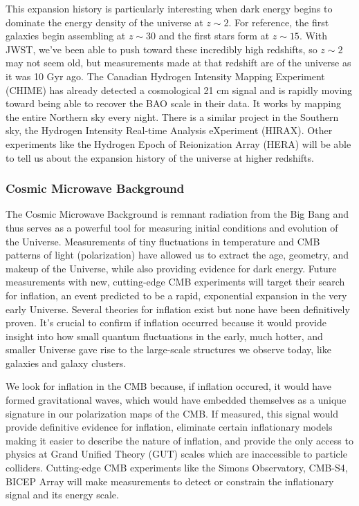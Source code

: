 This expansion history is particularly interesting when dark energy begins to dominate the energy density of the universe at $z \sim 2$. For reference, the first galaxies begin assembling at $z \sim 30$ and the first stars form at $z \sim 15$. With JWST, we've been able to push toward these incredibly high redshifts, so $z \sim 2$ may not seem old, but measurements made at that redshift are of the universe as it was 10 Gyr ago. The Canadian Hydrogen Intensity Mapping Experiment (CHIME) has already detected a cosmological 21 cm signal and is rapidly moving toward being able to recover the BAO scale in their data. It works by mapping the entire Northern sky every night. There is a similar project in the Southern sky, the Hydrogen Intensity Real-time Analysis eXperiment (HIRAX). Other experiments like the Hydrogen Epoch of Reionization Array (HERA) will be able to tell us about the expansion history of the universe at higher redshifts.

\subsubsection{Cosmic Microwave Background}

The Cosmic Microwave Background is remnant radiation from the Big Bang and thus serves as a powerful tool for measuring initial conditions and evolution of the Universe. Measurements of tiny fluctuations in temperature and CMB patterns of light (polarization) have allowed us to extract the age, geometry, and makeup of the Universe, while also providing evidence for dark energy. Future measurements with new, cutting-edge CMB experiments will target their search for inflation, an event predicted to be a rapid, exponential expansion in the very early Universe. Several theories for inflation exist but none have been definitively proven. It's crucial to confirm if inflation occurred because it would provide insight into how small quantum fluctuations in the early, much hotter, and smaller Universe gave rise to the large-scale structures we observe today, like galaxies and galaxy clusters.

We look for inflation in the CMB because, if inflation occured, it would have formed gravitational waves, which would have embedded themselves as a unique signature in our polarization maps of the CMB. If measured, this signal would provide definitive evidence for inflation, eliminate certain inflationary models making it easier to describe the nature of inflation, and provide the only access to physics at Grand Unified Theory (GUT) scales which are inaccessible to particle colliders. Cutting-edge CMB experiments like the Simons Observatory, CMB-S4, BICEP Array will make measurements to detect or constrain the inflationary signal and its energy scale. 

